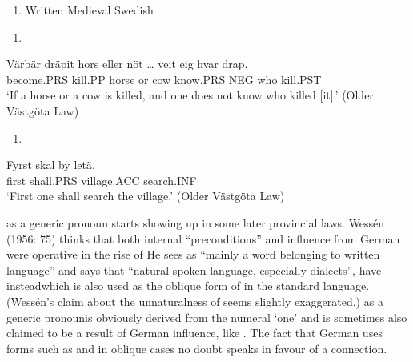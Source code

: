 \begin{enumerate} %
\item 
Written Medieval Swedish

\end{enumerate} %
\setcounter{listLFOxcviiileveli}{0}
\begin{enumerate} %
\item 
\end{enumerate} %
\ea\label{}
\gll Värþär  dräpit  hors  eller  nöt  …  veit  eig  hvar  drap.\\


become.PRS  kill.PP  horse  or  cow    know.PRS  NEG  who  kill.PST\\ %


‘If a horse or a cow is killed, and one does not know who killed [it].’ (Older Västgöta Law)
\z


\begin{enumerate} %
\item 
\end{enumerate} %
\ea\label{}
\gll Fyrst  skal  by  letä.\\


first  shall.PRS  village.ACC  search.INF\\ %


‘First one shall search the village.’ (Older Västgöta Law)
\z


 as a generic pronoun starts showing up in some later provincial laws. Wessén (1956: 75) thinks that both internal “preconditions” and influence from German were operative in the rise of He sees  as “mainly a word belonging to written language” and says that “natural spoken language, especially dialects”, have instead\textstyleLinguisticExample{, }which is also used as the oblique form of  in the standard language. (Wessén’s claim about the unnaturalness of  seems slightly exaggerated.) as a generic pronoun\textstyleLinguisticExample{ }is obviously derived from the numeral ‘one’ and is sometimes also claimed to be a result of German influence, like . The fact that German uses forms such as  and  in oblique cases no doubt speaks in favour of a connection.


